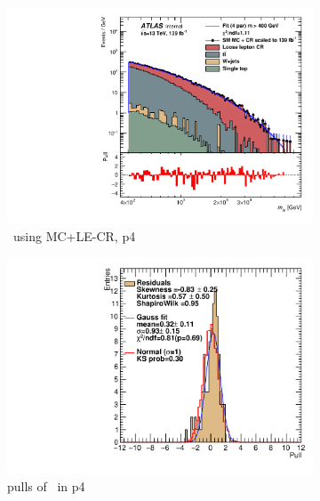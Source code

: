 \newpage

\begin{figure}[ht]
    \centering
    \begin{subfigure}[h]{0.38\linewidth}
    \includegraphics[scale=0.3]{figs/ch6/fit/variable_nosmooth/p4/1PB/output_SMMCplusCR_Mje_p4.pdf}%
    \caption{\mje \ using MC+LE-CR, p4}
    \end{subfigure}
    \hfill
    \begin{subfigure}[h]{0.4\linewidth}
    \includegraphics[scale=0.32]{figs/ch6/fit/variable_nosmooth/p4/1PB/pull_SMMCplusCR_Mje_p4.pdf}%
    \caption{pulls of \mje \ in p4}
    \end{subfigure}
    \hfill
    \begin{subfigure}[h]{0.38\linewidth}

\end{subfigure}
\end{figure}
